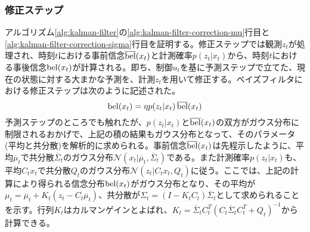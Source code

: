 \documentclass[dvipdfmx,a4paper]{jsarticle}
\begin{document}
\subsubsection{修正ステップ}
アルゴリズム\ref{alg:kalman-filter}の\ref{alg:kalman-filter-correction-mu}行目と\ref{alg:kalman-filter-correction-sigma}行目を証明する。修正ステップでは観測$z_t$が処理され、時刻$t$における事前信念$\operatorname{\overline{bel}}(x_t)$と計測確率$p(z_t | x_t)$から、時刻$t$における事後信念$\operatorname{bel}(x_t)$が計算される。即ち、制御$u_t$を基に予測ステップで立てた、現在の状態に対する大まかな予測を、計測$z_t$を用いて修正する。ベイズフィルタにおける修正ステップは次のように記述された。
\begin{equation}
	\operatorname{bel}(x_t) = \eta p(z_t | x_t) \operatorname{\overline{bel}}(x_t)
\end{equation}
予測ステップのところでも触れたが、$p(z_t | x_t)$と$\operatorname{\overline{bel}}(x_t)$の双方がガウス分布に制限されるおかげで、上記の積の結果もガウス分布となって、そのパラメータ(平均と共分散)を解析的に求められる。事前信念$\operatorname{\overline{bel}}(x_t)$は先程示したように、平均$\overline{\mu}_t$で共分散$\overline{\Sigma}_t$のガウス分布$\mathcal{N}(x_t | \overline{\mu}_t, \overline{\Sigma}_t)$である。また計測確率$p(z_t | x_t)$も、平均$C_t x_t$で共分散$Q_t$のガウス分布$\mathcal{N}(z_t | C_t x_t, Q_t)$に従う。ここでは、上記の計算により得られる信念分布$\operatorname{bel}(x_t)$がガウス分布となり、その平均が$\mu_t = \overline{\mu}_t + K_t \left( z_t - C_t \overline{\mu}_t \right)$、共分散が$\Sigma_t = \left( I - K_t C_t \right) \overline{\Sigma}_t$として求められることを示す。行列$K_t$はカルマンゲインとよばれ、$K_t = \overline{\Sigma}_t C_t^T \left( C_t \overline{\Sigma}_t C_t^T + Q_t \right)^{-1}$から計算できる。\newline
\end{document}
